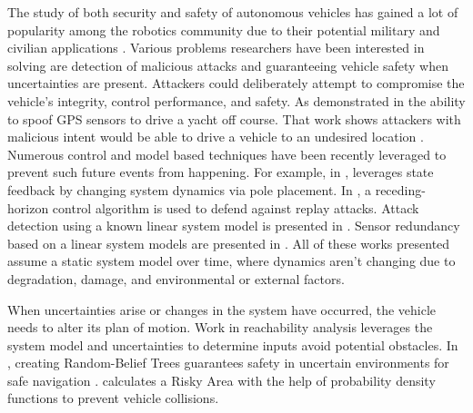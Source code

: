 The study of both security and safety of autonomous vehicles has gained a lot of popularity among the robotics community due to their potential military and civilian applications . Various problems researchers have been interested in solving are detection of malicious attacks and guaranteeing vehicle safety when uncertainties are present. Attackers could deliberately attempt to compromise the vehicle's integrity, control performance, and safety.  As demonstrated in \cite{lee} the ability to spoof GPS sensors to drive a yacht off course. That work shows attackers with malicious intent would be able to drive a vehicle to an undesired location . Numerous control and model based techniques have been recently leveraged to prevent such future events from happening. For example, in \cite{6426811}, leverages  state feedback by changing system dynamics via pole placement. In \cite{zhu2012resilient}, a receding-horizon control algorithm is used to defend against replay attacks. Attack detection using a known linear system model is presented in \cite{pasqualetti2013attack}. Sensor redundancy based on a linear system models are presented in \cite{fawzi2014secure,6943080,7330811} . All of these works presented  assume a static system model over time, where dynamics aren't changing due to degradation, damage, and environmental or external factors. 

When uncertainties arise or changes in the system have occurred, the vehicle needs to alter its plan of motion. Work in reachability analysis \cite{8046382,7799325,5980268} leverages the system model and uncertainties to determine inputs avoid potential obstacles.  In \cite{5980508}, creating Random-Belief Trees guarantees safety in uncertain environments for safe navigation . \cite{6934041} calculates  a Risky Area with the help of probability density functions to prevent vehicle collisions. 

